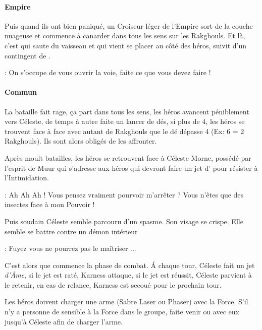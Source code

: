 \paragraph{Empire}
Puis quand ils ont bien paniqué, un Croiseur léger de l’Empire sort de la couche nuageuse et commence à canarder dans tous les sens sur les Rakghouls. Et là, c’est  qui saute du vaisseau et qui vient se placer au côté des héros, suivit d’un contingent de . 
\begin{quotebox}
    : On s’occupe de vous ouvrir la voie, faite ce que vous devez faire !
\end{quotebox}

\paragraph{Commun}
La bataille fait rage, ça part dans tous les sens, les héros avancent péniblement vers Céleste, de temps à autre faite un lancer de dés, si plus de 4, les héros se trouvent face à face avec autant de Rakghouls que le dé dépasse 4 (Ex: 6 = 2 Rakghouls). Ils sont alors obligés de les affronter.

Après moult batailles, les héros se retrouvent face à Céleste Morne, possédé par l’esprit de Muur qui s’adresse aux héros qui devront faire un jet d’ pour résister à l’Intimidation. 
\begin{quotebox}
    : Ah Ah Ah ! Vous pensez vraiment pourvoir m’arrêter ? Vous n’êtes que des insectes face à mon Pouvoir !
\end{quotebox}
    Puis soudain Céleste semble parcouru d’un spasme. Son visage se crispe. Elle semble se battre contre un démon intérieur \ldot
\begin{quotebox}
    : Fuyez vous ne pourrez pas le maîtriser ... 
\end{quotebox}

C’est alors que commence la phase de combat. \'A chaque tour, Céleste fait un jet \textit{d’\^Ame}, si le jet est raté, Karness attaque, si le jet est réussit, Céleste parvient à le retenir, en cas de relance, Karness est secoué pour le prochain tour.

Les héros doivent charger une arme (Sabre Laser ou Phaser) avec la Force. S’il n’y a personne de sensible à la Force dans le groupe, faite venir  ou  avec eux jusqu’à Céleste afin de charger l’arme.

